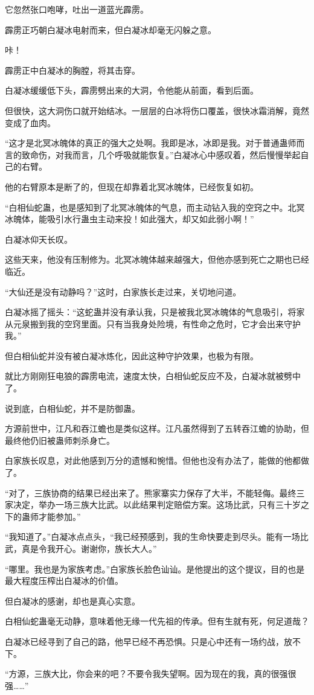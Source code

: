 \begin{this_body}
它忽然张口咆哮，吐出一道蓝光霹雳。

霹雳正巧朝白凝冰电射而来，但白凝冰却毫无闪躲之意。

咔！

霹雳正中白凝冰的胸膛，将其击穿。

白凝冰缓缓低下头，霹雳劈出来的大洞，令他能从前面，看到后面。

但很快，这大洞伤口就开始结冰。一层层的白冰将伤口覆盖，很快冰霜消解，竟然变成了血肉。

“这才是北冥冰魄体的真正的强大之处啊。我即是冰，冰即是我。对于普通蛊师而言的致命伤，对我而言，几个呼吸就能恢复。”白凝冰心中感叹着，然后慢慢举起自己的右臂。

他的右臂原本是断了的，但现在却靠着北冥冰魄体，已经恢复如初。

“白相仙蛇蛊，也是感知到了北冥冰魄体的气息，而主动钻入我的空窍之中。北冥冰魄体，能吸引水行蛊虫主动来投！如此强大，却又如此弱小啊！”

白凝冰仰天长叹。

这些天来，他没有压制修为。北冥冰魄体越来越强大，但他亦感到死亡之期也已经临近。

“大仙还是没有动静吗？”这时，白家族长走过来，关切地问道。

白凝冰摇了摇头：“这蛇蛊并没有承认我，只是被我北冥冰魄体的气息吸引，将家从元泉搬到我的空窍里面。只有当我身处险境，有性命之危时，它才会出来守护我。”

但白相仙蛇并没有被白凝冰炼化，因此这种守护效果，也极为有限。

就比方刚刚狂电狼的霹雳电流，速度太快，白相仙蛇反应不及，白凝冰就被劈中了。

说到底，白相仙蛇，并不是防御蛊。

方源前世中，江凡和吞江蟾也是类似这样。江凡虽然得到了五转吞江蟾的协助，但最终他仍旧被蛊师刺杀身亡。

白家族长叹息，对此他感到万分的遗憾和惋惜。但他也没有办法了，能做的他都做了。

“对了，三族协商的结果已经出来了。熊家寨实力保存了大半，不能轻侮。最终三家决定，举办一场三族大比武。以此结果判定赔偿方案。这场比武，只有三十岁之下的蛊师才能参加。”

“我知道了。”白凝冰点点头，“我已经预感到，我的生命快要走到尽头。能有一场比武，真是令我开心。谢谢你，族长大人。”

“哪里。我也是为家族考虑。”白家族长脸色讪讪。是他提出的这个提议，目的也是最大程度压榨出白凝冰的价值。

但白凝冰的感谢，却也是真心实意。

白相仙蛇蛊毫无动静，意味着他无缘一代先祖的传承。但有生就有死，何足道哉？

白凝冰已经寻到了自己的路，他早已经不再恐惧。只是心中还有一场约战，放不下。

“方源，三族大比，你会来的吧？不要令我失望啊。因为现在的我，真的很强很强……”

\end{this_body}

